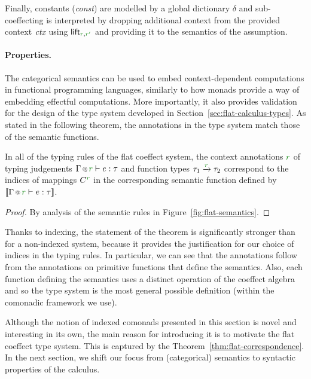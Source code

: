 Finally, constants (\emph{const}) are modelled by a global dictionary $\delta$ and sub-coeffecting
is interpreted by dropping additional context from the provided context $\textit{ctx}$ using 
$\ident{lift}_{\cclrd{r}, \cclrd{r'}}$ and providing it to the semantics of the assumption.

\paragraph{Properties.}

The categorical semantics can be used to embed context-dependent computations in functional 
programming languages, similarly to how monads provide a way of embedding effectful computations.
More importantly, it also provides validation for the design of the type system developed in 
Section~\ref{sec:flat-calculus-types}. As stated in the following theorem, the annotations in 
the type system match those of the semantic functions.

\vspace{2em}

\begin{theorem}[Correspondence]
\label{thm:flat-correspondence}
In all of the typing rules of the flat coeffect system, the context annotations $\cclrd{r}$ of typing 
judgements $\coctx{\Gamma}{\cclrd{r}} \vdash e : \tau$ and function types $\tau_1 \xrightarrow{\cclrd{r}} \tau_2$ 
correspond to the indices of mappings $\ctyp{\cclrd{r}}{}$ in the corresponding semantic function defined 
by $\sem{\coctx{\Gamma}{\cclrd{r}} \vdash e : \tau}$.
\end{theorem}
\begin{proof}
By analysis of the semantic rules in Figure~\ref{fig:flat-semantics}.
\end{proof}

\noindent
Thanks to indexing, the statement of the theorem is significantly stronger than for a 
non-indexed system, because it provides the justification for our choice of indices in the typing
rules. In particular, we can see that the annotations follow from the annotations on primitive 
functions that define the semantics. Also, each function defining the semantics uses a distinct 
operation of the coeffect algebra and so the type system is the most general possible definition
(within the comonadic framework we use).

Although the notion of indexed comonads presented in this section is novel and interesting 
in its own, the main reason for introducing it is to motivate the flat coeffect type system.
This is captured by the Theorem~\ref{thm:flat-correspondence}. In the next section, we shift our
focus from (categorical) semantics to syntactic properties of the calculus.


